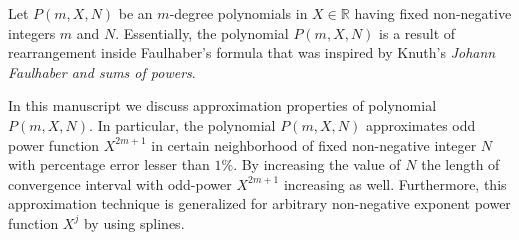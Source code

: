 Let $P(m, X, N)$ be an $m$-degree polynomials in $X\in\mathbb{R}$
having fixed non-negative integers $m$ and $N$.
Essentially, the polynomial $P(m, X, N)$ is a result of rearrangement inside Faulhaber's formula that
was inspired by Knuth's \textit{Johann Faulhaber and sums of powers}.

In this manuscript we discuss approximation properties of polynomial $P(m,X,N)$.
In particular, the polynomial $P(m,X,N)$ approximates odd power function $X^{2m+1}$ in certain neighborhood
of fixed non-negative integer $N$ with percentage error lesser than $1\%$.
By increasing the value of $N$ the length of convergence interval with odd-power $X^{2m+1}$ increasing as well.
Furthermore, this approximation technique is generalized for arbitrary non-negative exponent power function $X^j$
by using splines.
